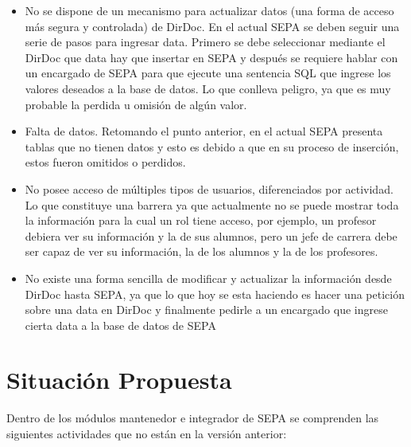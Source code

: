 \documentclass[a4paper,12pt,openany,oneside]{book}
\begin{document}
\begin{itemize}
	\item No se dispone de un mecanismo para actualizar datos (una forma de acceso más segura y controlada) de DirDoc. En el actual SEPA se deben seguir una serie de pasos para ingresar data. Primero se debe seleccionar mediante el DirDoc que data hay que insertar en SEPA y después se requiere hablar con un encargado de SEPA para que ejecute una sentencia SQL que ingrese los valores deseados a la base de datos. Lo que conlleva peligro, ya que es muy probable la perdida u omisión de algún valor.
	\item Falta de datos. Retomando el punto anterior, en el actual SEPA presenta tablas que no tienen datos y esto es debido a que en su proceso de inserción, estos fueron omitidos o perdidos.
	\item No posee acceso de múltiples tipos de usuarios, diferenciados por actividad. Lo que constituye una barrera ya que actualmente no se puede mostrar toda la información para la cual un rol tiene acceso, por ejemplo, un profesor debiera ver su información y la de sus alumnos, pero un jefe de carrera debe ser capaz de ver su información, la de los alumnos y la de los profesores. 
	\item No existe una forma sencilla de modificar y actualizar la información desde DirDoc hasta SEPA, ya que lo que hoy se esta haciendo es hacer una petición sobre una data en DirDoc y finalmente pedirle a un encargado que ingrese cierta data a la base de datos de SEPA
\end{itemize} 


\section{Situación Propuesta}
Dentro de los módulos mantenedor e integrador de SEPA se comprenden las siguientes actividades que no están en la versión anterior:
\end{document}

